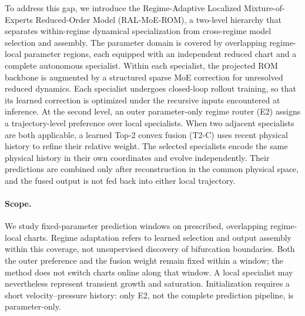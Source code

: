 \documentclass{article}
\begin{document}
To address this gap, we introduce the Regime-Adaptive Localized Mixture-of-Experts Reduced-Order Model (RAL-MoE-ROM), a two-level hierarchy that separates within-regime dynamical specialization from cross-regime model selection and assembly. The parameter domain is covered by overlapping regime-local parameter regions, each equipped with an independent reduced chart and a complete autonomous specialist. Within each specialist, the projected ROM backbone is augmented by a structured sparse MoE correction for unresolved reduced dynamics. Each specialist undergoes closed-loop rollout training, so that its learned correction is optimized under the recursive inputs encountered at inference. At the second level, an outer parameter-only regime router (E2) assigns a trajectory-level preference over local specialists. When two adjacent specialists are both applicable, a learned Top-2 convex fusion (T2-C) uses recent physical history to refine their relative weight. The selected specialists encode the same physical history in their own coordinates and evolve independently. Their predictions are combined only after reconstruction in the common physical space, and the fused output is not fed back into either local trajectory.


\paragraph{Scope.}
We study fixed-parameter prediction windows on prescribed, overlapping regime-local charts. Regime adaptation refers to learned selection and output assembly within this coverage, not unsupervised discovery of bifurcation boundaries. Both the outer preference and the fusion weight remain fixed within a window; the method does not switch charts online along that window. A local specialist may nevertheless represent transient growth and saturation. Initialization requires a short velocity--pressure history: only E2, not the complete prediction pipeline, is parameter-only.
\end{document}
